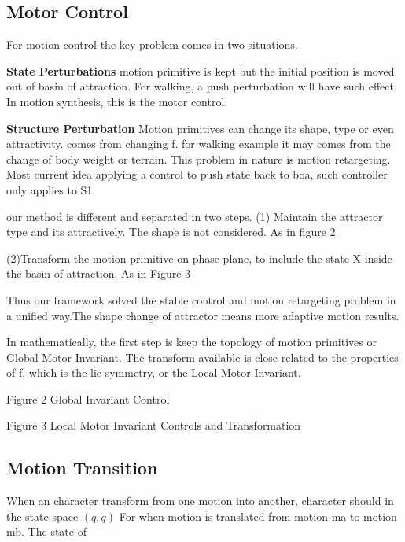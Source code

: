 \subsection{Motor Control}
For motion control the key problem comes in two situations.

\textbf{State Perturbations} motion primitive is kept but the initial position is moved out of basin of attraction.
For walking, a push perturbation will have such effect. In motion synthesis, this is the motor control.

\textbf{Structure Perturbation}
Motion primitives can change its shape, type or even attractivity.
comes from changing f. for walking example it may comes from the change of body weight or terrain. This problem in nature is motion retargeting.
Most current idea applying a control to push state back to boa, such controller only applies to S1.

our method is different and  separated in two steps.
(1) Maintain the attractor type and its attractively. The shape is not considered. As in figure 2

(2)Transform the motion primitive on phase plane, to include the state X inside the basin of attraction. As in Figure 3

Thus our framework solved the stable control and motion retargeting problem in a unified way.The shape change of attractor means more adaptive motion results.

In mathematically, the first step is keep the topology of motion primitives or Global Motor Invariant. The transform available is close related to the properties of f, which is the lie symmetry, or the Local Motor Invariant.



Figure 2 Global Invariant Control




Figure 3 Local Motor Invariant Controls and Transformation

\subsection{Motion Transition}
When an character transform from one motion into another, character should in the state space $(q,\dot{q})$
For when motion is translated from motion ma to motion mb.
The state of %
